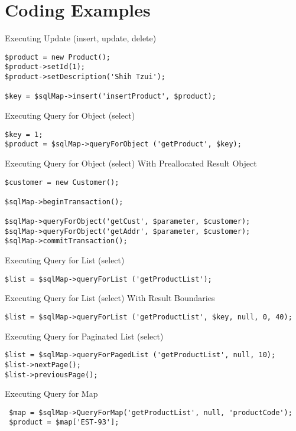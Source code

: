 \section{Coding Examples}
\begin{example}\label{example:10.1}
Executing Update (insert, update, delete)
\begin{verbatim}
$product = new Product();
$product->setId(1);
$product->setDescription('Shih Tzui');

$key = $sqlMap->insert('insertProduct', $product);
\end{verbatim}
\end{example}

\begin{example}\label{example:10.2}
Executing Query for Object (select)
\begin{verbatim}
$key = 1;
$product = $sqlMap->queryForObject ('getProduct', $key);
\end{verbatim}
\end{example}

\begin{example}\label{example:10.3}
Executing Query for Object (select) With Preallocated Result Object
\begin{verbatim}
$customer = new Customer();

$sqlMap->beginTransaction();

$sqlMap->queryForObject('getCust', $parameter, $customer);
$sqlMap->queryForObject('getAddr', $parameter, $customer);
$sqlMap->commitTransaction();
\end{verbatim}
\end{example}

\begin{example}\label{example:10.4}
Executing Query for List (select)
\begin{verbatim}
$list = $sqlMap->queryForList ('getProductList');
\end{verbatim}
\end{example}

\begin{example}\label{example:10.4}
Executing Query for List (select) With Result Boundaries
\begin{verbatim}
$list = $sqlMap->queryForList ('getProductList', $key, null, 0, 40);
\end{verbatim}
\end{example}

\begin{example}\label{example:10.5}
Executing Query for Paginated List (select)
\begin{verbatim}
$list = $sqlMap->queryForPagedList ('getProductList', null, 10);
$list->nextPage();
$list->previousPage();
\end{verbatim}
\end{example}

\begin{example}\label{example:10.6}
Executing Query for Map
\begin{verbatim}
 $map = $sqlMap->QueryForMap('getProductList', null, 'productCode');
 $product = $map['EST-93'];
\end{verbatim}
\end{example}
